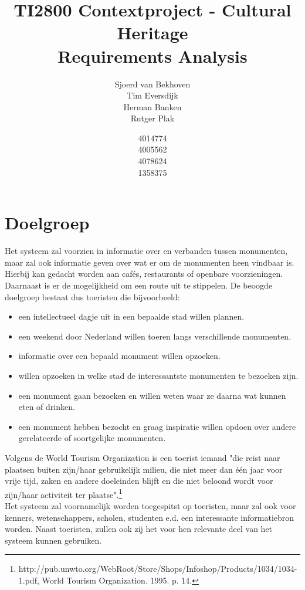 \documentclass{article}
\begin{document}
\title{TI2800 Contextproject - Cultural Heritage \\ Requirements Analysis}
\author{Sjoerd van Bekhoven \\ Tim Eversdijk \\ Herman Banken \\ Rutger Plak \and 4014774 \\ 4005562 \\ 4078624 \\ 1358375}
\maketitle

\section{Doelgroep}
Het systeem zal voorzien in informatie over en verbanden tussen monumenten, maar zal ook informatie geven over wat er om de monumenten heen vindbaar is. Hierbij kan gedacht worden aan caf\'es, restaurants of openbare voorzieningen. Daarnaast is er de mogelijkheid om een route uit te stippelen. De beoogde doelgroep bestaat dus toeristen die bijvoorbeeld:
\begin{itemize}
		\item{een intellectueel dagje uit in een bepaalde stad willen plannen.}
		\item{een weekend door Nederland willen toeren langs verschillende monumenten.}
		\item{informatie over een bepaald monument willen opzoeken.}
		\item{willen opzoeken in welke stad de interessantste monumenten te bezoeken zijn.}
		\item{een monument gaan bezoeken en willen weten waar ze daarna wat kunnen eten of drinken.}
		\item{een monument hebben bezocht en graag inspiratie willen opdoen over andere gerelateerde of soortgelijke monumenten.}
\end{itemize}
Volgens de World Tourism Organization is een toerist iemand "die reist naar plaatsen buiten zijn/haar gebruikelijk milieu, die niet meer dan \'e\'en jaar voor vrije tijd, zaken en andere doeleinden blijft en die niet beloond wordt voor zijn/haar activiteit ter plaatse".\footnote{http://pub.unwto.org/WebRoot/Store/Shops/Infoshop/Products/1034/1034-1.pdf, World Tourism Organization. 1995. p. 14.} \\
Het systeem zal voornamelijk worden toegespitst op toeristen, maar zal ook voor kenners, wetenschappers, scholen, studenten e.d. een interessante informatiebron worden. Naast toeristen, zullen ook zij het voor hen relevante deel van het systeem kunnen gebruiken.
\clearpage
\end{document}

